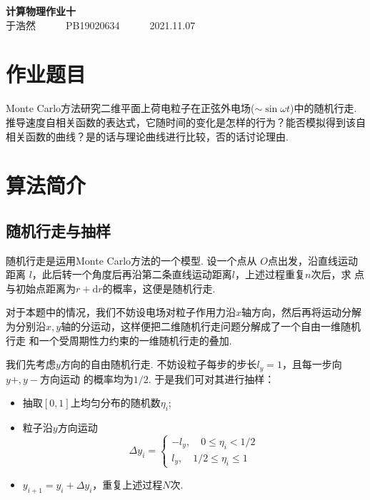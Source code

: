 \documentclass[12pt,a4paper,utf8]{ctexart}
\begin{document}
\begin{center}
    {\LARGE\textbf{计算物理作业十}}\\
    \textrm{于浩然}~~~~~~\textrm{PB19020634}~~~~~~\textrm{2021.11.07}
\end{center}

\section{作业题目}

Monte Carlo方法研究二维平面上荷电粒子在正弦外电场($\sim \sin \omega
t$)中的随机行走.推导速度自相关函数的表达式，它随时间的变化是怎样的行为？能否模拟得到该自相关函数的曲线？是的话与理论曲线进行比较，否的话讨论理由.

\section{算法简介}

\subsection{随机行走与抽样}

随机行走是运用Monte Carlo方法的一个模型. 设一个点从
$O$点出发，沿直线运动距离
$l$，此后转一个角度后再沿第二条直线运动距离$l$，上述过程重复$n$次后，求
点与初始点距离为$r + \textrm{d}r$的概率，这便是随机行走.

对于本题中的情况，我们不妨设电场对粒子作用力沿$x$轴方向，然后再将运动分解
为分别沿$x,y$轴的分运动，这样便把二维随机行走问题分解成了一个自由一维随机行走
和一个受周期性力约束的一维随机行走的叠加. 

我们先考虑$y$方向的自由随机行走. 不妨设粒子每步的步长$l_y=1$，且每一步向$y+,y-$方向运动
的概率均为$1/2$. 于是我们可对其进行抽样：
\begin{itemize}
    \item 抽取$[0,1]$上均匀分布的随机数$\eta_i$;
    \item 粒子沿$y$方向运动
        \begin{equation}
            \Delta y_i = 
            \begin{cases}
                -l_y,\quad 0 \leq \eta_i < 1/2 \\
                l_y, \quad 1/2 \leq \eta_i \leq 1
            \end{cases}
        \end{equation}
    \item $y_{i+1} = y_i + \Delta y_i$，重复上述过程$N$次.
\end{itemize}
\end{document}
